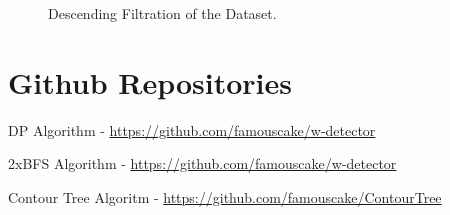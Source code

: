 \begin{appendices}
\begin{figure}[h]

    \caption{Descending Filtration of the Dataset.}%
    \label{fig:desc-filtration-tree}%
\end{figure}


\chapter{Github Repositories}
\label{chapter-github}


DP Algorithm - \url{https://github.com/famouscake/w-detector}

2xBFS Algorithm - \url{https://github.com/famouscake/w-detector}

Contour Tree Algoritm - \url{https://github.com/famouscake/ContourTree}


\end{appendices}

